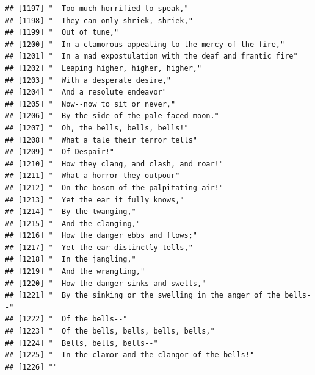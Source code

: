 \documentclass{article}\usepackage[]{graphicx}\usepackage[]{color}
\makeatletter
\newenvironment{kframe}{%
 \def\at@end@of@kframe{}%
 \ifinner\ifhmode%
  \def\at@end@of@kframe{\end{minipage}}%
  \begin{minipage}{\columnwidth}%
 \fi\fi%
 \def\FrameCommand##1{\hskip\@totalleftmargin \hskip-\fboxsep
 \colorbox{shadecolor}{##1}\hskip-\fboxsep
     \hskip-\linewidth \hskip-\@totalleftmargin \hskip\columnwidth}%
 \MakeFramed {\advance\hsize-\width
   \@totalleftmargin\z@ \linewidth\hsize
   \@setminipage}}%
 {\par\unskip\endMakeFramed%
 \at@end@of@kframe}
\newenvironment{knitrout}{}{} %
\makeatother
\begin{document}
\begin{knitrout}
\begin{kframe}
\begin{verbatim}
## [1197] "  Too much horrified to speak,"                                              
## [1198] "  They can only shriek, shriek,"                                             
## [1199] "  Out of tune,"                                                              
## [1200] "  In a clamorous appealing to the mercy of the fire,"                        
## [1201] "  In a mad expostulation with the deaf and frantic fire"                     
## [1202] "  Leaping higher, higher, higher,"                                           
## [1203] "  With a desperate desire,"                                                  
## [1204] "  And a resolute endeavor"                                                   
## [1205] "  Now--now to sit or never,"                                                 
## [1206] "  By the side of the pale-faced moon."                                       
## [1207] "  Oh, the bells, bells, bells!"                                              
## [1208] "  What a tale their terror tells"                                            
## [1209] "  Of Despair!"                                                               
## [1210] "  How they clang, and clash, and roar!"                                      
## [1211] "  What a horror they outpour"                                                
## [1212] "  On the bosom of the palpitating air!"                                      
## [1213] "  Yet the ear it fully knows,"                                               
## [1214] "  By the twanging,"                                                          
## [1215] "  And the clanging,"                                                         
## [1216] "  How the danger ebbs and flows;"                                            
## [1217] "  Yet the ear distinctly tells,"                                             
## [1218] "  In the jangling,"                                                          
## [1219] "  And the wrangling,"                                                        
## [1220] "  How the danger sinks and swells,"                                          
## [1221] "  By the sinking or the swelling in the anger of the bells--"                
## [1222] "  Of the bells--"                                                            
## [1223] "  Of the bells, bells, bells, bells,"                                        
## [1224] "  Bells, bells, bells--"                                                     
## [1225] "  In the clamor and the clangor of the bells!"                               
## [1226] ""                                                                            

\end{verbatim}
\end{kframe}
\end{knitrout}
\end{document}

